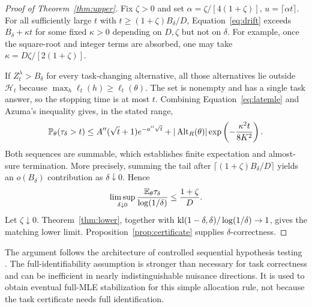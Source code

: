 \begin{proof}[Proof of Theorem~\ref{thm:upper}]
Fix $\zeta>0$ and set $\alpha=\zeta/[4(1+\zeta)]$, $u=\lceil\alpha t\rceil$. For all sufficiently large $t$ with $t\ge(1+\zeta)B_\delta/D$, Equation~\eqref{eq:drift} exceeds $B_\delta+\kappa t$ for some fixed $\kappa>0$ depending on $D,\zeta$ but not on $\delta$. For example, once the square-root and integer terms are absorbed, one may take $\kappa=D\zeta/[2(1+\zeta)]$.

If $Z_t^\lambda>B_\delta$ for every task-changing alternative, all those alternatives lie outside $\mathcal H_t$ because $\max_h\ell_t(h)\ge\ell_t(\theta)$. The set is nonempty and has a single task answer, so the stopping time is at most $t$. Combining Equation~\eqref{eq:latemle} and Azuma's inequality gives, in the stated range,
\begin{equation}
\mathbb P_\theta(\tau_\delta>t)
\le A''(\sqrt t+1)e^{-a''\sqrt t}
+|\operatorname{Alt}_R(\theta)|\exp\left(-\frac{\kappa^2t}{8K^2}\right). \label{eq:stoppingtail}
\end{equation}
Both sequences are summable, which establishes finite expectation and almost-sure termination. More precisely, summing the tail after $\lceil(1+\zeta)B_\delta/D\rceil$ yields an $o(B_\delta)$ contribution as $\delta\downarrow0$. Hence
\begin{equation}
\limsup_{\delta\downarrow0}\frac{\mathbb E_\theta\tau_\delta}{\log(1/\delta)}\le\frac{1+\zeta}{D}.
\end{equation}
Let $\zeta\downarrow0$. Theorem~\ref{thm:lower}, together with $\operatorname{kl}(1-\delta,\delta)/\log(1/\delta)\to1$, gives the matching lower limit. Proposition~\ref{prop:certificate} supplies $\delta$-correctness.
\end{proof}
The argument follows the architecture of controlled sequential hypothesis testing \citep{nitinawarat2012}. The full-identifiability assumption is stronger than necessary for task correctness and can be inefficient in nearly indistinguishable nuisance directions. It is used to obtain eventual full-MLE stabilization for this simple allocation rule, not because the task certificate needs full identification.

